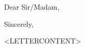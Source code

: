 \documentclass[12pt,letter,sans]{moderncv}        %
\begin{document}
\date{<DATETODAY>}
\opening{Dear Sir/Madam,}
\closing{Sincerely,}
\makelettertitle

<LETTERCONTENT>

\makeletterclosing


\newpage
\end{document}
